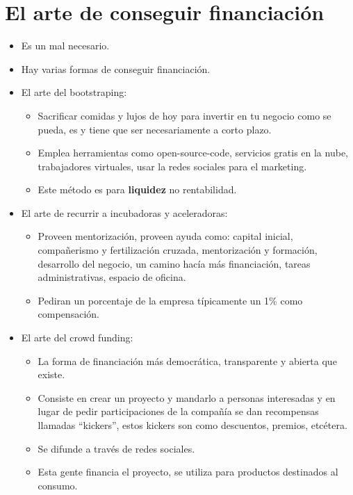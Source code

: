 \documentclass{article}
\begin{document}
\section{El arte de conseguir financiación}
\begin{itemize}
    \item Es un mal necesario.
    \item Hay varias formas de conseguir financiación.
    \item El arte del bootstraping:
        \begin{itemize}
            \item Sacrificar comidas y lujos de hoy para invertir en tu negocio como se pueda, es y tiene que ser necesariamente a corto plazo.
            \item Emplea herramientas como open-source-code, servicios gratis en la nube, trabajadores virtuales, usar la redes sociales para el marketing.
            \item Este método es para \textbf{liquidez} no rentabilidad.
        \end{itemize}
    
    \item El arte de recurrir a incubadoras y aceleradoras:
        \begin{itemize}
            \item Proveen mentorización, proveen ayuda como: capital inicial, compañerismo y fertilización cruzada, mentorización y formación, desarrollo del negocio, un camino hacía más financiación, tareas administrativas, espacio de oficina.
            \item Pediran un porcentaje de la empresa típicamente un 1\% como compensación.
        \end{itemize}
    
    \item El arte del crowd funding:
        \begin{itemize}
            \item La forma de financiación más democrática, transparente y abierta que existe.
            \item Consiste en crear un proyecto y mandarlo a personas interesadas y en lugar de pedir participaciones de la compañía se dan recompensas llamadas  ``kickers'', estos kickers son como descuentos, premios, etcétera.
            \item Se difunde a través de redes sociales.
            \item Esta gente financia el proyecto, se utiliza para productos destinados al consumo.
        \end{itemize}
    

\end{itemize}
\end{document}
